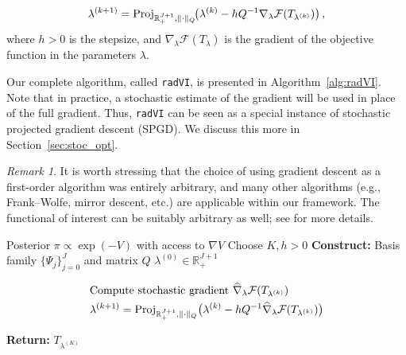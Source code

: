 \documentclass[twoside]{article}
\newcommand{\cF}{\mathcal{F}}
\newcommand{\1}{\mathds{1}}
\newcommand{\R}{\mathbb{R}}
\theoremstyle{plain}
\theoremstyle{definition}
\theoremstyle{remark}
\newtheorem{remark}[theorem]{Remark}
\begin{document}
\begin{align}\label{eq:det_iterates}
    \lambda^{(k+1)} = {\rm Proj}_{\R^{J+1}_+,\|\cdot\|_Q}\!\bigl(\lambda^{(k)} - h Q^{-1}\nabla_\lambda \cF(T_{\lambda^{(k)}})\bigr)\,,
\end{align}
where $h > 0$ is the stepsize, and $\nabla_\lambda \cF(T_\lambda)$ is the gradient of the objective function in the parameters $\lambda$. 

Our complete algorithm, called \texttt{radVI}, is presented in Algorithm~\ref{alg:radVI}. Note that in practice, a stochastic estimate of the gradient will be used in place of the full gradient. Thus, \texttt{radVI} can be seen as a special instance of stochastic projected gradient descent (SPGD). We discuss this more in Section~\ref{sec:stoc_opt}. 
\begin{remark}
    It is worth stressing that the choice of using gradient descent as a first-order algorithm was entirely arbitrary, and many other algorithms (e.g., Frank--Wolfe, mirror descent, etc.) are applicable within our framework. The functional of interest can be suitably arbitrary as well; see \cite{JiaChePoo24MFVI} for more details.
\end{remark}
\begin{algorithm}[t]
\caption{\texttt{radVI}}\label{alg:radVI}
\begin{algorithmic}
 Posterior $\pi \propto \exp(-V)$ with access to $\nabla V$
 Choose $K, h > 0$
\State\textbf{Construct:} Basis family $\{\Psi_j\}_{j=0}^J$ and matrix $Q$
 $\lambda^{(0)} \in \R^{J+1}_+$

\begin{align*}
    &\text{Compute stochastic gradient } \widehat\nabla_\lambda \cF(T_{\lambda^{(k)}}) \\
    &\lambda^{(k+1)} = {\rm Proj}_{\R^{J+1}_+,\|\cdot\|_Q}\bigl(\lambda^{(k)} - hQ^{-1}\widehat\nabla_\lambda \cF(T_{\lambda^{(k)}})\bigr)
\end{align*}

\EndWhile{}
\State \textbf{Return:} $T_{\lambda^{(K)}}$
\end{algorithmic}
\end{algorithm}
\vspace{-4mm}
\end{document}
